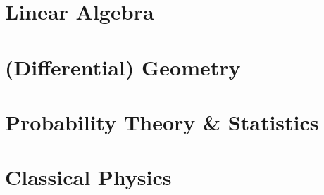 \documentclass[12pt, a4paper]{report}
\begin{document}







\part{Linear Algebra}
\insertparttoc









\part{(Differential) Geometry}\label{part:diffgeom}
\insertparttoc


















\part{Probability Theory \& Statistics}
\insertparttoc









\part{Classical Physics}
\insertparttoc






\end{document}
